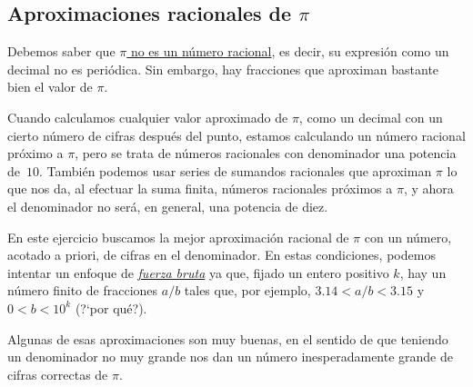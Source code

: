 

\subsection{Aproximaciones racionales de $\pi$}

Debemos saber que \href{http://150.244.21.37/PDFs/APROX/pi-irracional.pdf}{$\pi$ no es un
n\'umero racional}, es decir, su
expresi\'on como un decimal no es peri\'odica. Sin embargo, hay fracciones que
aproximan bastante bien el valor de $\pi$.

Cuando calculamos cualquier valor aproximado de  $\pi$, como un decimal con un
cierto n\'umero de cifras despu\'es del punto,  estamos calculando un n\'umero
racional pr\'oximo a $\pi$, pero se trata de n\'umeros racionales con
denominador
una potencia de~$10$. Tambi\'en podemos usar series de sumandos racionales que
aproximan $\pi$ lo que nos da, al efectuar la suma finita, n\'umeros racionales
pr\'oximos a $\pi$, y ahora el denominador  no ser\'a, en general,  una potencia
de diez.

En este ejercicio buscamos la mejor aproximaci\'on racional de $\pi$ con un
n\'umero, acotado a priori, de cifras en el denominador. En estas condiciones,
podemos intentar un enfoque de \hyperref[bruta]{\itshape fuerza bruta} ya que,
fijado un entero
positivo $k$,  hay un n\'umero finito de fracciones $a/b$ tales que, por
ejemplo,  $3{.}14<a/b<3{.}15$ y $0<b<10^k$ (?`por qu\'e?). 

Algunas de esas aproximaciones son muy buenas, en el sentido de que teniendo un
denominador no muy grande nos dan un n\'umero inesperadamente grande de cifras
correctas de $\pi$.

